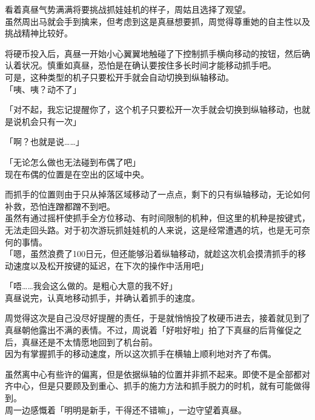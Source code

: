 看着真昼气势满满将要挑战抓娃娃机的样子，周姑且选择了观望。\\

虽然周出马就会手到擒来，但考虑到这是真昼想要抓，周觉得尊重她的自主性以及挑战精神比较好。

将硬币投入后，真昼一开始小心翼翼地触碰了下控制抓手横向移动的按钮，然后确认着状况。慎重如真昼，恐怕是在确认要按住多长时间才能移动抓手吧。\\

可是，这种类型的机子只要松开手就会自动切换到纵轴移动。\\

「咦、咦？动不了」

「对不起，我忘记提醒你了，这个机子只要松开一次手就会切换到纵轴移动，也就是说机会只有一次」

「啊？也就是说……」

「无论怎么做也无法碰到布偶了吧」\\

现在布偶的位置是在空出的区域中央。

而抓手的位置则由于只从掉落区域移动了一点点，剩下的只有纵轴移动，无论如何补救，恐怕连蹭都蹭不到吧。\\

虽然有通过摇杆使抓手全方位移动、有时间限制的机种，但这里的机种是按键式，无法走回头路。对于初次游玩抓娃娃机的人来说，这是经常遭遇的坑，也是无可奈何的事情。\\

「嗯，虽然浪费了100日元，但还能够沿着纵轴移动，就趁这次机会摸清抓手的移动速度以及松开按键的延迟，在下次的操作中活用吧」

「唔……我会这么做的。是粗心大意的我不好」\\

真昼说完，认真地移动抓手，并确认着抓手的速度。

周觉得这次是自己没尽好提醒的责任，于是就悄悄投了枚硬币进去，接着就见到了真昼朝他露出不满的表情。不过，周说着「好啦好啦」拍了下真昼的后背催促之后，真昼还是不太情愿地回到了机台前。\\

因为有掌握抓手的移动速度，所以这次抓手在横轴上顺利地对齐了布偶。

虽然离中心有些许的偏离，但是依据纵轴的位置并非抓不起来。即使不是全部都对齐中心，但是只要顾及到重心、抓手的施力方法和抓手脱力的时机，就有可能做得到。\\

周一边感慨着「明明是新手，干得还不错嘛」，一边守望着真昼。\\

